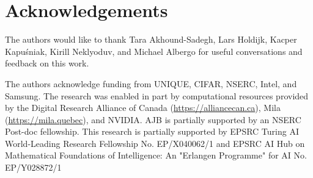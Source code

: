 \section*{Acknowledgements}
\label{sec:acknowledgements}
The authors would like to thank Tara Akhound-Sadegh, Lars Holdijk, Kacper Kapuśniak, Kirill Neklyoduv, and Michael Albergo for useful conversations and feedback on this work.

The authors acknowledge funding from UNIQUE, CIFAR, NSERC, Intel, and Samsung. The research was enabled in part by computational resources provided by the Digital Research Alliance of Canada (\url{https://alliancecan.ca}), Mila (\url{https://mila.quebec}), and NVIDIA.
AJB is partially supported by an NSERC Post-doc
fellowship. This research is partially supported by EPSRC Turing AI World-Leading Research
Fellowship No. EP/X040062/1 and EPSRC AI Hub on Mathematical Foundations of Intelligence:
An "Erlangen Programme" for AI No. EP/Y028872/1
